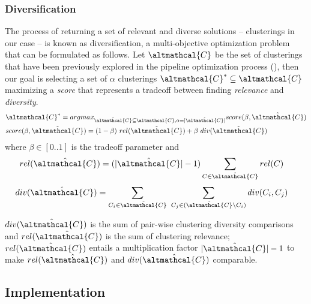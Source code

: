 \subsubsection{Diversification} The process of returning a set of relevant and diverse solutions -- clusterings in our case -- is known as diversification, a multi-objective optimization problem that can be formulated as follows.
%
Let $\altmathcal{C}$ be the set of clusterings that have been previously explored in the pipeline optimization process (), then our goal is selecting a set of $\alpha$ clusterings $\altmathcal{C}^* \subseteq \altmathcal{C}$ maximizing a \textit{score} that represents a tradeoff between finding \textit{relevance} and \textit{diversity}.
%
\begin{align}\label{def:score}
&\altmathcal{C}^* = argmax_{\hat{\altmathcal{C}} \subseteq \altmathcal{C}, \alpha=|\hat{\altmathcal{C}}|} score(\beta, \hat{\altmathcal{C}})\\
&score(\beta, \hat{\altmathcal{C}}) = (1-\beta)~rel(\hat{\altmathcal{C}}) + \beta~div(\hat{\altmathcal{C}})
\end{align}
where $\beta \in [0.. 1]$ is the tradeoff parameter and
\begin{align}
rel(\hat{\altmathcal{C}}) &= (|\hat{\altmathcal{C}}|-1)\sum_{C \in \hat{\altmathcal{C}}} rel(C)
\label{def:rel}
\end{align}
\vspace{-1cm}
\begin{align}
div(\hat{\altmathcal{C}}) &= \sum_{C_i \in \hat{\altmathcal{C}}}~\sum_{C_j \in (\hat{\altmathcal{C}} \setminus C_i)} div(C_i, C_j)
\label{def:div}
\end{align}

\noindent $div(\hat{\altmathcal{C}})$ is the sum of pair-wise clustering diversity comparisons and $rel(\hat{\altmathcal{C}})$ is the sum of clustering relevance;
$rel(\hat{\altmathcal{C}})$ entails a multiplication factor $|\hat{\altmathcal{C}}|-1$ to make $rel(\hat{\altmathcal{C}})$ and $div(\hat{\altmathcal{C}})$ comparable.


\subsection{Implementation}\label{clustering-sec:implementation}

